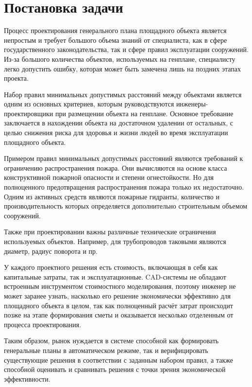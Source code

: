\section*{\Large{Постановка задачи}}


Процесс проектирования генерального плана площадного объекта является непростым
и требует большого объема знаний от специалиста, как в сфере государственного законодательства,
так и сфере правил эксплуатации сооружений.
Из-за большого количества объектов, используемых на генплане, специалисту легко допустить ошибку,
которая может быть замечена лишь на поздних этапах проекта.

Набор правил минимальных допустимых расстояний между объектами является одним из основных критериев,
которым руководствуются инженеры-проектировщики при размещении объекта на генплане.
Основное требование заключается в нахождении объекта на достаточном удалении от остальных,
с целью снижения риска для здоровья и жизни людей во время эксплуатации площадного объекта.

Примером правил минимальных допустимых расстояний являются
требований к ограничению распространения пожара. %
Они вычисляются на основе класса конструктивной пожарной опасности и степени огнестойкости.
Но для полноценного предотвращения распространения пожара только их недостаточно.
Одним из активных средств являются пожарные гидранты, количество и производительность которых определяется
дополнительно строительным объемом сооружений.

Также при проектировании важны различные технические ограничения используемых объектов.
Например, для трубопроводов таковыми являются диаметр, радиус поворота и пр.

У каждого проектного решения есть стоимость, включающая в себя как капитальные затраты, так и эксплуатационные.
CAD-системы не обладают встроенным инструментом стоимостного моделирования,
поэтому инженер не может заранее узнать,
насколько его решение экономически эффективно для площадного объекта в целом,
так как полноценный расчёт затрат происходит позже на этапе формирования сметы
и оказывается несколько отделенным от процесса проектирования.

Таким образом, рынок нуждается в системе способной как формировать генеральные планы в автоматическом режиме,
так и верифицировать существующие решения в соответствии с заданным набором правил,
а также способной оценивать и сравнивать решения с точки зрения экономической эффективности.

